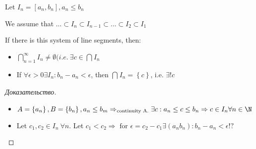 Let $I_n = \left[ a_n, b_n \right], a_n \leq b_n$
 
We assume that $\dots \subset I_n \subset I_{n-1} \subset \dots \subset I_2 \subset I_1$

\begin{theorem}[]
	If there is this system of line segments, then: 
	\begin{itemize}
		\item $\bigcap_{n=1} ^\infty I_n \neq \emptyset (i.e. \ \exists c \in \bigcap_{} I_{n} $
		\item If $\forall \epsilon > 0 \exists I_n: b_n - a_n < \epsilon$, then $\bigcap_{} I_n = \left\{ c \right \}  $, i.e. $\exists ! c$ 
	\end{itemize}
\end{theorem}

\begin{proof}[Доказательство]
	\begin{itemize}
		\item $A = \left\{ a_n \right \}, B = \left\{ b_n \right \}, a_n \leq b_m \Rightarrow _ \text{continuity A.} \exists c: a_n \leq c \leq b_n \Rightarrow c \in I_n \forall n \in \N  $ 
		\item Let $c_1, c_2 \in I_n \ \forall n$. Let $c_1 < c_2 \Rightarrow \text{ for } \epsilon = c_2 - c_1 \exists (a_n b_n): b_n - a_n < \epsilon !?$ 
	\end{itemize}
\end{proof}

